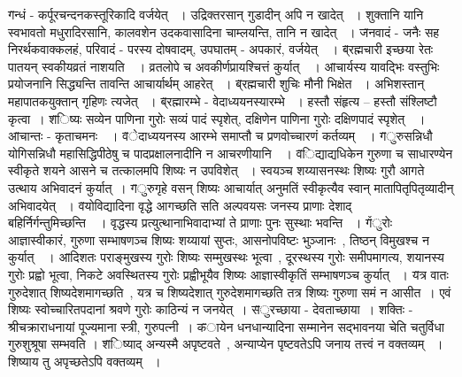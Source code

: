 {{{{{{{\fontsize{14}{16}\selectfont \v  गन्धं - कर्पूरचन्दनकस्तूरिकादि वर्जयेत् ~। उद्रिक्तरसान् गुडादीन् अपि न खादेत् ~। शुक्तानि यानि स्वभावतो मधुरादिरसानि, कालवशेन उदकवासादिना चाम्लयन्ति, तानि न खादेत् ~।}
{\fontsize{14}{16}\selectfont \v  जनवादं - जनैः सह निरर्थकवाक्कलहं, परिवादं - परस्य दोषवादम्, उपघातम् - अपकारं, वर्जयेत्~~।}
{\fontsize{14}{16}\selectfont \v  ब्रह्मचारी इच्छया रेतः पातयन् स्वकीयव्रतं  नाशयति~~। व्रतलोपे च अवकीर्णप्रायश्चित्तं कुर्यात्~~।}
{\fontsize{14}{16}\selectfont \v  आचार्यस्य यावद्भिः वस्तुभिः प्रयोजनानि सिद्ध्यन्ति तावन्ति आचार्यार्थम्  आहरेत् ~।}
{\fontsize{14}{16}\selectfont \v  ब्रह्मचारी शुचिः मौनी भिक्षेत ~। अभिशस्तान् महापातकयुक्तान् गृहिणः त्यजेत् ~।}
{\fontsize{14}{16}\selectfont \v  ब्रह्मारम्भे - वेदाध्ययनस्यारम्भे ~। हस्तौ संहृत्य – हस्तौ संश्लिष्टौ कृत्वा~।}
{\fontsize{14}{16}\selectfont \v   शिष्यः सव्येन पाणिना गुरोः सव्यं पादं स्पृशेत्, दक्षिणेन पाणिना गुरोः दक्षिणपादं स्पृशेत्~~।}
{\fontsize{14}{16}\selectfont \v  आचान्तः - कृताचमनः~~।}
{\fontsize{14}{16}\selectfont \v  वेदाध्ययनस्य आरम्भे समाप्तौ च प्रणवोच्चारणं कर्तव्यम्~~।}
{\fontsize{14}{16}\selectfont \v  गुरुसन्निधौ योगिसन्निधौ महासिद्धिपीठेषु च  पादप्रक्षालनादीनि न आचरणीयानि~~।}
{\fontsize{14}{16}\selectfont \v  विद्याद्यधिकेन गुरुणा च साधारण्येन स्वीकृते शयने आसने च तत्कालमपि शिष्यः न उपविशेत् ~। स्वयञ्च शय्यासनस्थः शिष्यः गुरौ आगते उत्थाय अभिवादनं कुर्यात्~।}
{\fontsize{14}{16}\selectfont \v  गुरुगृहे वसन् शिष्यः आचार्यात्  अनुमतिं स्वीकृत्यैव स्वान्   मातापितृपितृव्यादीन् अभिवादयेत् ~।}
{\fontsize{14}{16}\selectfont \v  वयोविद्यादिना वृद्धे आगच्छति सति अल्पवयसः जनस्य प्राणाः देशाद् बहिर्निर्गन्तुमिच्छन्ति~~। वृद्धस्य प्रत्युत्थानाभिवादाभ्यां ते प्राणाः पुनः सुस्थाः भवन्ति ~। }
{\fontsize{14}{16}\selectfont \v \v  गुरोः आज्ञास्वीकारं, गुरुणा सम्भाषणञ्च शिष्यः शय्यायां सुप्तः, आसनोपविष्टः भुञ्जानः~, तिष्ठन् विमुखश्च न कुर्यात्~~।}
{\fontsize{14}{16}\selectfont \v  आदिशतः पराङ्मुखस्य गुरोः शिष्यः सम्मुखस्थः भूत्वा~, दूरस्थस्य गुरोः समीपमागत्य, शयानस्य गुरोः प्रह्वो भूत्वा, निकटे अवस्थितस्य गुरोः प्रह्वीभूयैव शिष्यः आज्ञास्वीकृतिं सम्भाषणञ्च कुर्यात् ~।}
{\fontsize{14}{16}\selectfont \v  यत्र वातः गुरुदेशात् शिष्यदेशमागच्छति~, यत्र च शिष्यदेशात् गुरुदेशमागच्छति तत्र शिष्यः गुरुणा समं न आसीत~। एवं    शिष्यः स्वोच्चारितपदानां श्रवणे गुरोः काठिन्यं न जनयेत्~।}
{\fontsize{14}{16}\selectfont \v  सुरच्छाया - देवताच्छाया~। शक्तिः - श्रीचक्राराधनायां पूज्यमाना स्त्री, गुरुपत्नी~।}
{\fontsize{14}{16}\selectfont \v कायेन धनधान्यादिना सम्मानेन सद्भावनया चेति चतुर्विधा गुरुशुश्रूषा सम्भवति ।}
{\fontsize{14}{16}\selectfont \v  शिष्याद् अन्यस्मै अपृष्टवते~, अन्याप्येन पृष्टवतेऽपि जनाय तत्त्वं न वक्तव्यम् ~। शिष्याय तु अपृच्छतेऽपि वक्तव्यम् ~। \footB \ }
}}}}}}
